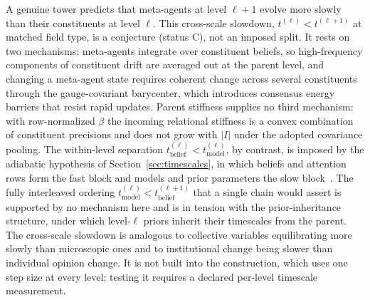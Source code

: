 A genuine tower predicts that meta-agents at level $\ell+1$ evolve more slowly than their constituents at level $\ell$. This cross-scale slowdown, $t^{(\ell)} < t^{(\ell+1)}$ at matched field type, is a conjecture (status C), not an imposed split. It rests on two mechanisms: meta-agents integrate over constituent beliefs, so high-frequency components of constituent drift are averaged out at the parent level, and changing a meta-agent state requires coherent change across several constituents through the gauge-covariant barycenter, which introduces consensus energy barriers that resist rapid updates. Parent stiffness supplies no third mechanism: with row-normalized $\beta$ the incoming relational stiffness is a convex combination of constituent precisions and does not grow with $|I|$ under the adopted covariance pooling. The within-level separation $t_{\mathrm{belief}}^{(\ell)} < t_{\mathrm{model}}^{(\ell)}$, by contrast, is imposed by the adiabatic hypothesis of Section~\ref{sec:timescales}, in which beliefs and attention rows form the fast block and models and prior parameters the slow block~\cite[Ch.~8]{DennisGaugeVFE2026}. The fully interleaved ordering $t_{\mathrm{model}}^{(\ell)} < t_{\mathrm{belief}}^{(\ell+1)}$ that a single chain would assert is supported by no mechanism here and is in tension with the prior-inheritance structure, under which level-$\ell$ priors inherit their timescales from the parent. The cross-scale slowdown is analogous to collective variables equilibrating more slowly than microscopic ones and to institutional change being slower than individual opinion change. It is not built into the construction, which uses one step size at every level; testing it requires a declared per-level timescale measurement.

